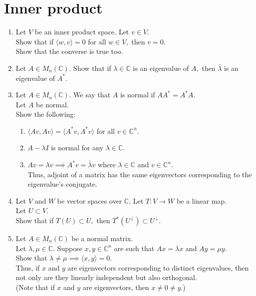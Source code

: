 \documentclass[12pt]{article}
\begin{document}
\section{Inner product}
\begin{enumerate}[leftmargin=*]
	\item Let $V$ be an inner product space. Let $v \in V.$\\
	Show that if $\langle w, v\rangle = 0$ for all $w \in V,$ then $v = 0.$\\
	Show that the converse is true too.
	\item Let $A \in M_n(\mathbb{C}).$ Show that if $\lambda \in \mathbb{C}$ is an eigenvalue of $A,$ then $\bar{\lambda}$ is an eigenvalue of $A^*.$
	\item Let $A \in M_n(\mathbb{C}).$ We say that $A$ is normal if $AA^* = A^*A.$\\
	Let $A$ be normal.\\
	Show the following:
	\begin{enumerate} 
		\item $\langle Av, Av\rangle = \langle A^*v, A^*v\rangle$ for all $v \in \mathbb{C}^n.$
		\item $A - \lambda I$ is normal for any $\lambda \in \mathbb{C}.$
		\item $Av = \lambda v \implies A^*v = \bar{\lambda} v$ where $\lambda \in \mathbb{C}$ and $v \in \mathbb{C}^n.$\\
		Thus, adjoint of a matrix has the same eigenvectors corresponding to the eigenvalue's conjugate.
	\end{enumerate}
	\item Let $V$ and $W$ be vector spaces over $\mathbb{C}.$ Let $T:V\to W$ be a linear map.\\
	Let $U \subset V.$\\
	Show that if $T(U) \subset U,$ then $T^*(U^\perp) \subset U^\perp.$
	\item Let $A \in M_n(\mathbb{C})$ be a normal matrix.\\
	Let $\lambda, \mu \in \mathbb{C}.$ Suppose $x, y \in \mathbb{C}^n$ are such that $Ax = \lambda x$ and $Ay = \mu y.$\\
	Show that $\lambda \neq \mu \implies \langle x, y\rangle = 0.$\\
	Thus, if $x$ and $y$ are eigenvectors corresponding to distinct eigenvalues, then not only are they linearly independent but also orthogonal.\\
	(Note that if $x$ and $y$ are eigenvectors, then $x \neq 0 \neq y.$)

\end{enumerate}
\end{document}

